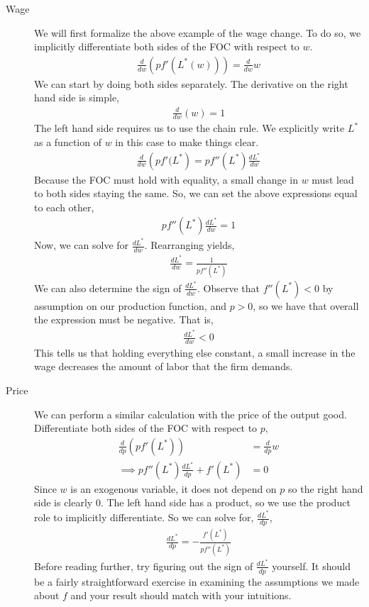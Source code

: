 \begin{description}
    \item[Wage] We will first formalize the above example of the wage change. To do so, we implicitly differentiate both sides of the FOC with respect to $w$. 
    \begin{align*}
            \frac{d}{dw} \left(p f'(L^*(w))\right) = \frac{d}{dw} w
    \end{align*}
    We can start by doing both sides separately. The derivative on the right hand side is simple, 
    \begin{align*}
        \frac{d}{dw}(w) = 1
    \end{align*} 
    The left hand side requires us to use the chain rule. We explicitly write $L^*$ as a function of $w$ in this case to make things clear.
    \begin{align*}
        \frac{d}{dw} \left(p f'(L^*\right) = p f''(L^*) \frac{dL^*}{dw}
    \end{align*}
    Because the FOC must hold with equality, a small change in $w$ must lead to both sides staying the same. So, we can set the above expressions equal to each other,
    \begin{align*}
        p f''(L^*) \frac{dL^*}{dw} = 1
    \end{align*}
    Now, we can solve for $\frac{dL^*}{dw}$. Rearranging yields,
    \begin{align*}
        \frac{dL^*}{dw} = \frac{1}{p f''(L^*)}
    \end{align*}
    We can also determine the sign of $\frac{dL^*}{dw}$. Observe that $f''(L^*) < 0$ by assumption on our production function, and $p > 0$, so we have that overall the expression must be negative. That is,
    \begin{align*}
        \frac{dL^*}{dw} < 0
    \end{align*}
    This tells us that holding everything else constant, a small increase in the wage decreases the amount of labor that the firm demands. 

    \item[Price] We can perform a similar calculation with the price of the output good. Differentiate both sides of the FOC with respect to $p$,
    \begin{align*}
        \frac{d}{dp} \left(p f'(L^*)\right) &= \frac{d}{dp} w \\
        \implies p f''(L^*) \frac{d L^*}{dp} + f'(L^*) &= 0
    \end{align*} 
    Since $w$ is an exogenous variable, it does not depend on $p$ so the right hand side is clearly 0. The left hand side has a product, so we use the product role to implicitly differentiate. So we can solve for, $\frac{dL^*}{dp}$,
    \begin{align*}
        \frac{dL^*}{dp} = -\frac{f'(L^*)}{p f''(L^*)}
    \end{align*}
    Before reading further, try figuring out the sign of $\frac{dL^*}{dp}$ yourself. It should be a fairly straightforward exercise in examining the assumptions we made about $f$ and your result should match with your intuitions.


\end{description}
